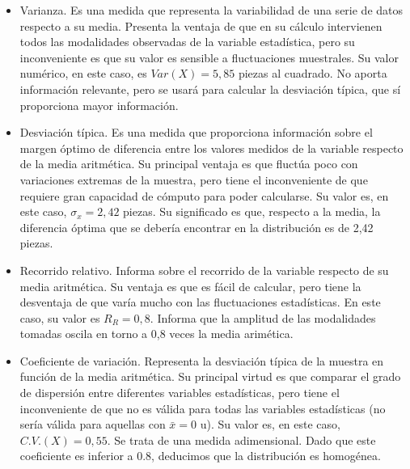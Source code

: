 \begin{itemize}
	\item Varianza. Es una medida que representa la variabilidad de una serie de datos respecto a su media. Presenta la ventaja de que en su cálculo intervienen todos las modalidades observadas de la variable estadística, pero su inconveniente es que su valor es sensible a fluctuaciones muestrales. Su valor numérico, en este caso, es $Var(X) = 5,85$ piezas al cuadrado. No aporta información relevante, pero se usará para calcular la desviación típica, que sí proporciona mayor información. 
	
	\item Desviación típica. Es una medida que proporciona información sobre el margen óptimo de diferencia entre los valores medidos de la variable respecto de la media aritmética. Su principal ventaja es que fluctúa poco con variaciones extremas de la muestra, pero tiene el inconveniente de que requiere gran capacidad de cómputo para poder calcularse. Su valor es, en este caso, $\sigma_{x} = 2,42$ piezas. Su significado es que, respecto a la media, la diferencia óptima que se debería encontrar en la distribución es de 2,42 piezas.
	
	\item Recorrido relativo. Informa sobre el recorrido de la variable respecto de su media aritmética. Su ventaja es que es fácil de calcular, pero tiene la desventaja de que varía mucho con las fluctuaciones estadísticas. En este caso, su valor es $R_{R} = 0,8$. Informa que la amplitud de las modalidades tomadas oscila en torno a 0,8 veces la media arimética.
	
	
	\item Coeficiente de variación. Representa la desviación típica de la muestra en función de la media aritmética. Su principal virtud es que comparar el grado de dispersión entre diferentes variables estadísticas, pero tiene el inconveniente de que no es válida para todas las variables estadísticas (no sería válida para aquellas con $\bar x = 0$ u). Su valor es, en este caso, $C.V.(X) = 0,55$. Se trata de una medida adimensional. Dado que este coeficiente es inferior a 0.8, deducimos que la distribución es homogénea. 
	
\end{itemize}




